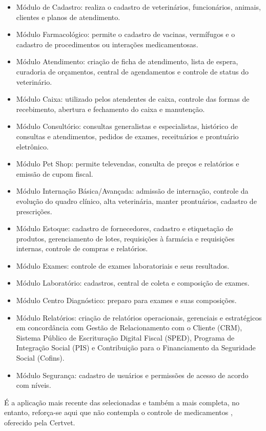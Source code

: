 \documentclass[
    12pt,               %
    openright,          %
    oneside,
    a4paper,            %
    BIBLATEX,           %
    TODO,               %
    english,            %
    brazil              %
    ]{ifsp-spo-inf-ctds}
\begin{document}
\begin{itemize}
    \item Módulo de Cadastro: realiza o cadastro de veterinários, funcionários, animais, clientes e planos de atendimento.
    \item Módulo Farmacológico: permite o cadastro de vacinas, vermífugos e o cadastro de procedimentos ou interações medicamentosas.
    \item Módulo Atendimento: criação de ficha de atendimento, lista de espera, curadoria de orçamentos, central de   agendamentos e controle de status do veterinário.
    \item Módulo Caixa: utilizado pelos atendentes de caixa, controle das formas de recebimento, abertura e fechamento do caixa e manutenção.
    \item Módulo Consultório: consultas generalistas e especialistas, histórico de consultas e atendimentos, pedidos de exames, receituários e prontuário eletrônico.
    \item Módulo Pet Shop: permite televendas, consulta de preços e relatórios e emissão de cupom fiscal.
    \item Módulo Internação Básica/Avançada: admissão de internação, controle da evolução do quadro clínico, alta veterinária, manter prontuários, cadastro de prescrições.
    \item Módulo Estoque: cadastro de fornecedores, cadastro e etiquetação de produtos, gerenciamento de lotes, requisições à farmácia e requisições internas, controle de compras e relatórios.
    \item Módulo Exames: controle de exames laboratoriais e seus resultados.
    \item Módulo Laboratório: cadastros, central de coleta e composição de exames.
    \item Módulo Centro Diagnóstico: preparo para exames e suas composições.
    \item Módulo Relatórios: criação de relatórios operacionais, gerenciais e estratégicos em concordância com Gestão de Relacionamento com o Cliente (CRM), Sistema Público de Escrituração Digital Fiscal (SPED), Programa de Integração Social (PIS) e Contribuição para o Financiamento da Seguridade Social (Cofins).
    \item Módulo Segurança: cadastro de usuários e permissões de acesso de acordo com níveis.
\end{itemize}

    É a aplicação mais recente das selecionadas e também a mais completa, no entanto, reforça-se aqui que não contempla o controle de medicamentos , oferecido pela Certvet.
\end{document}
